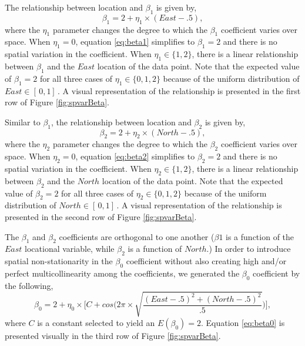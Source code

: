 \documentclass{article}\usepackage[]{graphicx}\usepackage[]{color}
\begin{document}
The relationship between location and $\beta _1$ is given by,
\begin{equation}\label{eq:beta1}
\beta _1 =  2 + \eta _1 \times (East - .5) ,
\end{equation}
where the $\eta _1$ parameter changes the degree to which the $\beta _1$ coefficient varies over space. When $\eta _1 =0$, equation \eqref{eq:beta1} simplifies to $\beta _1 =2$ and there is no spatial variation in the coefficient. When $\eta _1 \in \{1, 2\}$, there is a linear relationship between $\beta _1$ and the $East$ location of the data point. Note that the expected value of $\beta _1 = 2$ for all three cases of $\eta _1 \in \{0, 1, 2\}$ because of the uniform distribution of $East \in [\, 0, 1]\,$. A visual representation of the relationship is presented in the first row of Figure \ref{fig:spvarBeta}.

Similar to $\beta _1$, the relationship between location and $\beta _2$ is given by,
\begin{equation}\label{eq:beta2}
\beta _2 =  2 + \eta _2 \times (North- .5),
\end{equation}
where the $\eta _2$ parameter changes the degree to which the $\beta _2$ coefficient varies over space. When $\eta _2 =0$, equation \eqref{eq:beta2} simplifies to $\beta _2 =2$ and there is no spatial variation in the coefficient. When $\eta _2 \in \{1, 2\}$, there is a linear relationship between $\beta _2$ and the $North$ location of the data point. Note that the expected value of $\beta _2 = 2$ for all three cases of $\eta _2 \in \{0, 1, 2\}$ because of the uniform distribution of $North \in [\, 0, 1]\,$. A visual representation of the relationship is presented in the second row of Figure \ref{fig:spvarBeta}.

The $\beta _1$ and $\beta _2$ coefficients are orthogonal to one another ($\beta 1$ is a function of the $East$ locational variable, while $\beta _2$ is a function of $North$.) In order to introduce spatial non-stationarity in the $\beta _0$ coefficient without also creating high and/or perfect multicollinearity among the coefficients, we generated the $\beta _0$ coefficient by the following,
\begin{equation}\label{eq:beta0}
\beta _0 = 2 + \eta _0 \times \Bigg[C + cos\Bigg(2\pi\times\sqrt{\frac{(East - .5)^2 + (North- .5)^2}{.5}}\Bigg)\Bigg],
\end{equation}
where $C$ is a constant selected to yield an $E(\beta _0) = 2$. Equation \eqref{eq:beta0} is presented visually in the third row of Figure \ref{fig:spvarBeta}.
\end{document}
